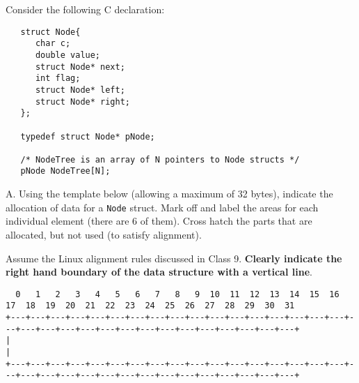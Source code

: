 \begin{problem}{10}
Consider the following C declaration:

\begin{verbatim}
   struct Node{
      char c;
      double value;
      struct Node* next;
      int flag;
      struct Node* left;
      struct Node* right;
   };

   typedef struct Node* pNode;

   /* NodeTree is an array of N pointers to Node structs */
   pNode NodeTree[N];

\end{verbatim}
\end{problem}

A. Using the template below (allowing a maximum of 32 bytes), indicate
the allocation of data for a {\tt Node} struct.  Mark
off and label the areas for each individual element (there are 6 of
them).  Cross hatch the parts that are allocated, but not used (to
satisfy alignment).  

Assume the Linux alignment rules discussed in Class 9.  {\bf Clearly
indicate the right hand boundary of the data structure with a vertical
line}.


{\tiny
\begin{verbatim}
  0   1   2   3   4   5   6   7   8   9  10  11  12  13  14  15  16  17  18  19  20  21  22  23  24  25  26  27  28  29  30  31
+---+---+---+---+---+---+---+---+---+---+---+---+---+---+---+---+---+---+---+---+---+---+---+---+---+---+---+---+---+---+---+---+
|                                                                                                                               |
+---+---+---+---+---+---+---+---+---+---+---+---+---+---+---+---+---+---+---+---+---+---+---+---+---+---+---+---+---+---+---+---+
\end{verbatim}
}




